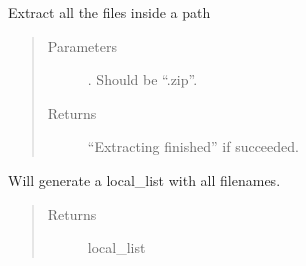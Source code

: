 \documentclass[letterpaper,10pt,english]{sphinxmanual}
\begin{document}
\begin{fulllineitems}
\begin{fulllineitems}
\begin{quote}
\begin{description}
\end{description}\end{quote}

\end{fulllineitems}


\begin{fulllineitems}
\label{\detokenize{DwdDataScrapper:DwdDataScrapper.DataScrapper.extract_zip}}
\sphinxAtStartPar
{} Extract all the files inside a path
\begin{quote}\begin{description}
\item[{Parameters}] \leavevmode
\sphinxAtStartPar
{} \textendash{} . Should be “.zip”.

\item[{Returns}] \leavevmode
\sphinxAtStartPar
“Extracting finished” if succeeded.

\end{description}\end{quote}

\end{fulllineitems}


\begin{fulllineitems}
\label{\detokenize{DwdDataScrapper:DwdDataScrapper.DataScrapper.generate_local_list}}
\sphinxAtStartPar
{} Will generate a local\_list with all filenames.
\begin{quote}\begin{description}
\item[{Returns}] \leavevmode
\sphinxAtStartPar
local\_list 

\end{description}\end{quote}

\end{fulllineitems}


\end{fulllineitems}
\end{document}
